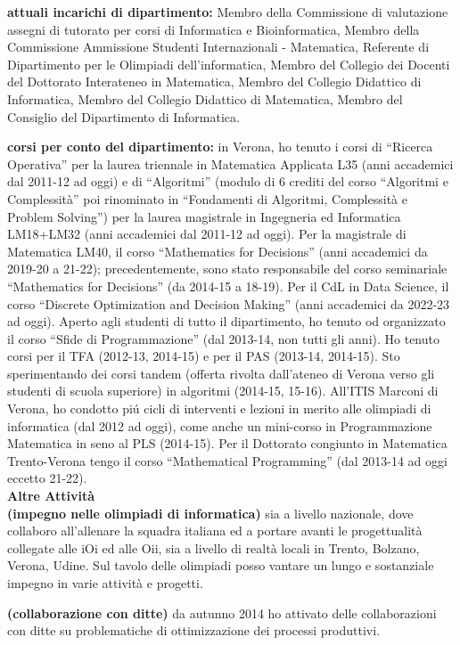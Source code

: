 \documentclass[10pt]{article}
\newcommand{\subvoice}[1] { {\large \bf #1} \smallskip\\ }
\begin{document}
{\bf attuali incarichi di dipartimento:} Membro della Commissione di valutazione assegni di tutorato per corsi di Informatica e Bioinformatica, Membro della Commissione Ammissione Studenti
Internazionali - Matematica, Referente di Dipartimento per le Olimpiadi dell'informatica, Membro del Collegio dei Docenti del Dottorato Interateneo in Matematica, Membro del Collegio Didattico di Informatica, Membro del Collegio Didattico di Matematica, Membro del Consiglio del Dipartimento di Informatica.

{\bf corsi per conto del dipartimento:} in Verona,
ho tenuto i corsi
di ``Ricerca Operativa''
per la laurea triennale in Matematica Applicata L35 (anni accademici dal 2011-12 ad oggi)
e di ``Algoritmi'' (modulo di 6 crediti del corso ``Algoritmi e Complessità'' poi rinominato in ``Fondamenti di Algoritmi, Complessità e Problem Solving'')
per la laurea magistrale in Ingegneria ed Informatica LM18+LM32 (anni accademici dal 2011-12 ad oggi).
Per la magistrale di Matematica LM40, il corso ``Mathematics for Decisions'' (anni accademici da 2019-20 a 21-22); precedentemente, sono stato responsabile del corso seminariale ``Mathematics for Decisions'' (da 2014-15 a 18-19).
Per il CdL in Data Science, il corso ``Discrete Optimization and Decision Making'' (anni accademici da 2022-23 ad oggi).
Aperto agli studenti di tutto il dipartimento, ho tenuto od organizzato il corso ``Sfide di Programmazione'' (dal 2013-14, non tutti gli anni).
Ho tenuto corsi per il TFA (2012-13, 2014-15) e per il PAS (2013-14, 2014-15).
Sto sperimentando dei corsi tandem (offerta rivolta dall'ateneo di Verona verso gli studenti di scuola superiore) in algoritmi (2014-15, 15-16).
All'ITIS Marconi di Verona, ho condotto pi\'u cicli di interventi e lezioni in merito alle olimpiadi di informatica (dal 2012 ad oggi),
come anche un mini-corso in Programmazione Matematica in seno al PLS (2014-15). 
Per il Dottorato congiunto in Matematica Trento-Verona tengo il corso
``Mathematical Programming'' (dal 2013-14 ad oggi eccetto 21-22).\\


\subvoice{Altre Attivit\`a}
\indent
{\bf (impegno nelle olimpiadi di informatica)}
sia a livello nazionale, dove collaboro all'allenare la squadra italiana
ed a portare avanti le progettualit\`a collegate alle iOi ed alle Oii,
sia a livello di realt\`a locali in Trento, Bolzano, Verona, Udine.
Sul tavolo delle olimpiadi posso vantare un lungo e sostanziale impegno in varie attivit\`a e progetti. 

{\bf (collaborazione con ditte)}
da autunno 2014 ho attivato delle collaborazioni con ditte
su problematiche di ottimizzazione dei processi produttivi.
\end{document}
